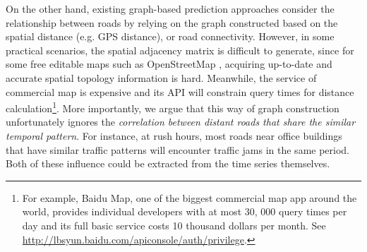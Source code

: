 \documentclass{article}
\begin{document}
 On the other hand, existing graph-based prediction approaches consider the relationship between roads by  relying on   the graph constructed based on the spatial distance (e.g. GPS distance), or road connectivity. However, in some practical scenarios, the spatial adjacency matrix is difficult to generate, since for some free editable maps such as OpenStreetMap \cite{haklay2008openstreetmap}, acquiring up-to-date and  accurate spatial topology information is hard. Meanwhile, the service of commercial map is expensive and its API will constrain query times for distance calculation\footnote{For example, Baidu Map, one of the biggest commercial map app around the world, provides individual developers with at most 30, 000 query times per day and its full basic service costs 10 thousand dollars per month. See \url{http://lbsyun.baidu.com/apiconsole/auth/privilege}.}.
  More importantly, we argue that this way of graph construction unfortunately ignores the \emph{correlation between distant roads that share the similar temporal pattern}.  For instance, at rush hours, most roads near office buildings that have similar traffic patterns will encounter traffic jams in the same period. Both of these influence could be extracted from the time series themselves.
\end{document}
